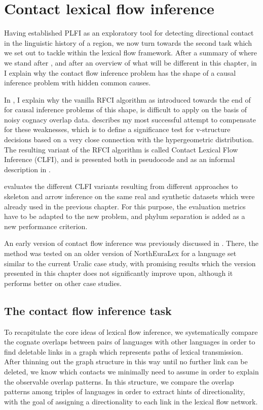 \chapter{Contact lexical flow inference}\label{sec:7}
Having established PLFI as an exploratory tool for detecting directional contact in the linguistic history of a region, we now turn towards the second task which we set out to tackle within the lexical flow framework. After a summary of where we stand after , and after an overview of what will be different in this chapter, in  I explain why the contact flow inference problem has the shape of a causal inference problem with hidden common causes. 

In , I explain why the vanilla RFCI algorithm as introduced towards the end of  for causal inference problems of this shape, is difficult to apply on the basis of noisy cognacy overlap data.  describes my most successful attempt to compensate for these weaknesses, which is to define a significance test for v-structure decisions based on a very close connection with the hypergeometric distribution. The resulting variant of the RFCI algorithm is called Contact Lexical Flow Inference (CLFI), and is presented both in pseudocode and as an informal description in . 

 evaluates the different CLFI variants resulting from different approaches to skeleton and arrow inference on the same real and synthetic datasets which were already used in the previous chapter. For this purpose, the evaluation metrics have to be adapted to the new problem, and phylum separation is added as a new performance criterion.

An early version of contact flow inference was previously discussed in \cite{dellert2016a}. There, the method was tested on an older version of NorthEuraLex for a language set similar to the current Uralic case study, with promising results which the version presented in this chapter does not significantly improve upon, although it performs better on other case studies.

\section{The contact flow inference task}\label{sec:7.1}
To recapitulate the core ideas of lexical flow inference, we systematically compare the cognate overlaps between pairs of languages with other languages in order to find deletable links in a graph which represents paths of lexical transmission. After thinning out the graph structure in this way until no further link can be deleted, we know which contacts we minimally need to assume in order to explain the observable overlap patterns. In this structure, we compare the overlap patterns among triples of languages in order to extract hints of directionality, with the goal of assigning a directionality to each link in the lexical flow network.

